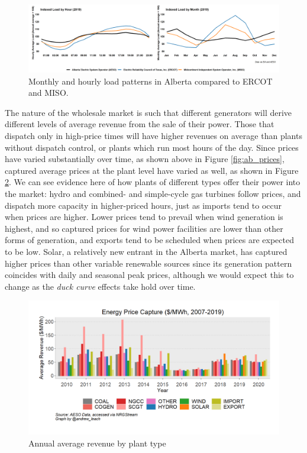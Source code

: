 \documentclass[12pt]{article}
\begin{document}
\begin{figure}[!h]%
	\centering \vspace{-.25cm} \includegraphics[width=6.5in]{../images/load_compare.png}
\vspace{-0.75cm}	\caption{Monthly and hourly load patterns in Alberta compared to ERCOT and MISO.}
\label{fig:load_pattern}
\end{figure}

The nature of the wholesale market is such that different generators will derive different levels of average revenue from the sale of their power. Those that dispatch only in high-price times will have higher revenues on average than plants without dispatch control, or plants which run most hours of the day. Since prices have varied substantially over time, as shown above in Figure \ref{fig:ab_prices}, captured average prices at the plant level have varied as well, as shown in Figure \ref{fig:capture_prices}. We can see evidence here of how plants of different types offer their power into the market: hydro and combined- and simple-cycle gas turbines follow prices, and dispatch more capacity in higher-priced hours, just as imports tend to occur when prices are higher. Lower prices tend to prevail when wind generation is highest, and so captured prices for wind power facilities are lower than other forms of generation, and exports tend to be scheduled when prices are expected to be low. Solar, a relatively new entrant in the Alberta market, has captured higher prices than other variable renewable sources since its generation pattern coincides with daily and seasonal peak prices, although we would expect this to change as the \emph{duck curve} effects take hold over time.

\begin{figure}[!h]%
	\centering \vspace{-.25cm} \includegraphics[width=6.5in]{../images/price_capture.png}
\vspace{-0.75cm}	\caption{Annual average revenue by plant type}
\label{fig:capture_prices}
\end{figure}
\end{document}
